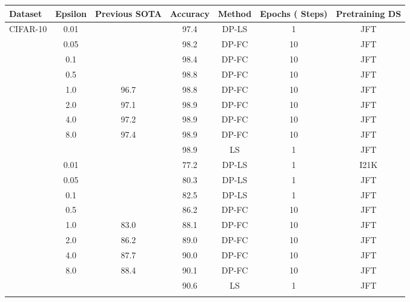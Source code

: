 \documentclass[letterpaper]{article} \usepackage{fullpage}
\begin{document}
\begin{table}[]
\centering
\small
\begin{tabular}{lcccccc}
    \toprule
        \addlinespace[0.1cm]
Dataset &                           Epsilon & Previous SOTA & Accuracy & Method & Epochs ( Steps) & Pretraining DS  \\
\midrule
\multirow{9}{*}{CIFAR-10}
&         0.01  &       & 97.4 & DP-LS & 1 & JFT \\
&         0.05  &       & 98.2 & DP-FC & 10 & JFT \\
&         0.1    &     & 98.4 & DP-FC & 10 & JFT \\
&         0.5    &     & 98.8 & DP-FC & 10 & JFT \\
&        1.0     &  96.7   & 98.8 & DP-FC & 10 & JFT\\
&       2.0     &  97.1  & 98.9 & DP-FC & 10 & JFT\\
&      4.0      & 97.2   & 98.9 & DP-FC & 10 & JFT\\
&     8.0       & 97.4  & 98.9 & DP-FC & 10 & JFT\\
&       &    & 98.9 & LS & 1 & JFT\\

                                  \addlinespace[0.1cm]
                                         \hline
                                          \addlinespace[0.1cm]

\multirow{9}{*}{CIFAR-100} 
&         0.01  &       & 77.2 & DP-LS & 1 & I21K \\
&         0.05  &       & 80.3 & DP-LS & 1 & JFT \\
&         0.1   &      & 82.5 & DP-LS & 1 & JFT \\
&         0.5   &      & 86.2 & DP-FC & 10 & JFT \\
&        1.0    &  83.0   & 88.1 & DP-FC & 10 & JFT\\
&       2.0     &  86.2  & 89.0 & DP-FC & 10 & JFT\\
&      4.0      &  87.7  & 90.0 & DP-FC & 10 & JFT\\
&     8.0       &  88.4   & 90.1 & DP-FC & 10 & JFT\\
&       &   & 90.6 & LS & 1 & JFT\\

                                  \addlinespace[0.1cm]
                                         \hline
                                          \addlinespace[0.1cm]


\end{tabular}
\end{table}
\end{document}
